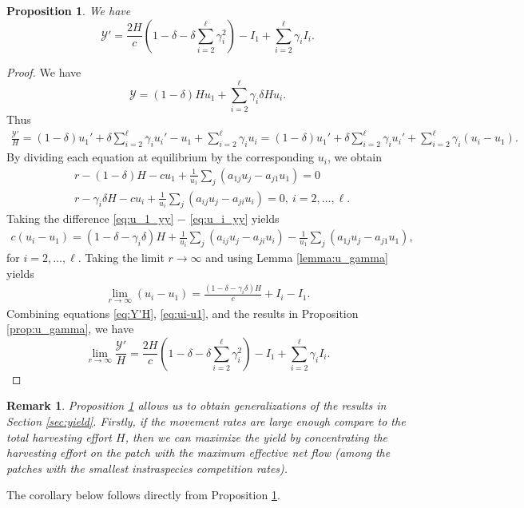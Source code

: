 \documentclass[11pt]{article}
\newtheorem{proposition}[theorem]{Proposition}
\newtheorem{remark}[theorem]{Remark}
\def\YY{\mathcal{Y}}
\theoremstyle{definition}
\begin{document}
\begin{proposition}\label{prop:Y'}
    We have
    \[
    \YY'=\frac{2H}{c}(1-\delta-\delta \sum_{i=2}^\ell\gamma_i^2) -I_1+\sum_{i=2}^\ell \gamma_iI_i.
    \]
\end{proposition}
\begin{proof}
 We have  
     \[
    \YY=(1-\delta)Hu_1 +\sum_{i=2}^\ell \gamma_i\delta Hu_i.
    \]
Thus
\begin{align}\label{eq:Y'H}
\frac{\YY'}{H}=(1-\delta)u_1'+\delta\sum_{i=2}^\ell \gamma_iu_i'-u_1+\sum_{i=2}^\ell \gamma_iu_i = (1-\delta)u_1'+\delta\sum_{i=2}^\ell \gamma_iu_i' + \sum_{i=2}^\ell \gamma_i(u_i-u_1).
\end{align}
By dividing each equation at equilibrium by the corresponding $u_i$, we obtain
\begin{align}
    &r-(1-\delta)H-cu_1+\frac{1}{u_1}\sum_j (a_{1j}u_j-a_{j1}u_1)=0\label{eq:u_1_yy}\\
    &r-\gamma_i\delta H-cu_i+\frac{1}{u_i}\sum_j (a_{ij}u_j-a_{ji}u_i)=0, \ i=2, \dots, \ell.\label{eq:u_i_yy}
\end{align}
Taking the difference \eqref{eq:u_1_yy} $-$ \eqref{eq:u_i_yy} yields
\begin{align}
    c(u_i-u_1)=(1-\delta-\gamma_i\delta)H+\frac{1}{u_i}\sum_j (a_{ij}u_j-a_{ji}u_i) - \frac{1}{u_1}\sum_j (a_{1j}u_j-a_{j1}u_1),
\end{align}
for $i=2,\dots, \ell$.
Taking the limit $r\to\infty$ and using Lemma \ref{lemma:u_gamma}  yields
\begin{align}\label{eq:ui-u1}
\lim_{r\to\infty} (u_i-u_1)=\frac{(1-\delta-\gamma_i\delta)H}{c}+I_i-I_1.
\end{align}
Combining equations \eqref{eq:Y'H}, \eqref{eq:ui-u1}, and the results in Proposition \ref{prop:u_gamma}, we have 
\[
\lim_{r\to\infty} \frac{\YY'}{H}= \frac{2H}{c}(1-\delta-\delta \sum_{i=2}^\ell\gamma_i^2) -I_1+\sum_{i=2}^\ell \gamma_iI_i.
\]
\end{proof}
\begin{remark}\normalfont
Proposition \ref{prop:Y'} allows us to obtain generalizations of the results in Section \ref{sec:yield}. Firstly, if the movement rates are large enough compare to the total harvesting effort $H$, then we can maximize the yield by concentrating the harvesting effort on the patch with the maximum effective net flow (among the patches with the smallest instraspecies competition rates). 
\end{remark} 

The corollary below follows directly from Proposition \ref{prop:Y'}.
\end{document}
